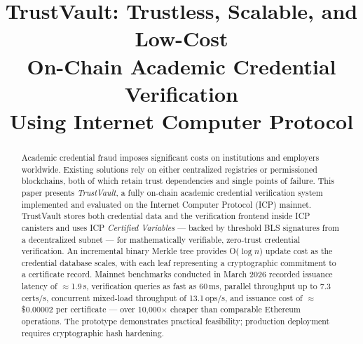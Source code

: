 \documentclass[conference,a4paper]{IEEEtran}
\begin{document}
\title{TrustVault: Trustless, Scalable, and Low-Cost\\On-Chain Academic Credential Verification\\Using Internet Computer Protocol}

\author{
  \and
  
}

\maketitle

\begin{abstract}
Academic credential fraud imposes significant costs on institutions and employers worldwide. Existing solutions rely on either centralized registries or permissioned blockchains, both of which retain trust dependencies and single points of failure. This paper presents \textit{TrustVault}, a fully on-chain academic credential verification system implemented and evaluated on the Internet Computer Protocol (ICP) mainnet. TrustVault stores both credential data and the verification frontend inside ICP canisters and uses ICP \textit{Certified Variables} — backed by threshold BLS signatures from a decentralized subnet — for mathematically verifiable, zero-trust credential verification. An incremental binary Merkle tree provides O($\log n$) update cost as the credential database scales, with each leaf representing a cryptographic commitment to a certificate record. Mainnet benchmarks conducted in March 2026 recorded issuance latency of $\approx$1.9\,s, verification queries as fast as 60\,ms, parallel throughput up to 7.3\,certs/s, concurrent mixed-load throughput of 13.1\,ops/s, and issuance cost of $\approx$\$0.00002 per certificate — over 10{,}000$\times$ cheaper than comparable Ethereum operations. The prototype demonstrates practical feasibility; production deployment requires cryptographic hash hardening.
\end{abstract}
\end{document}
